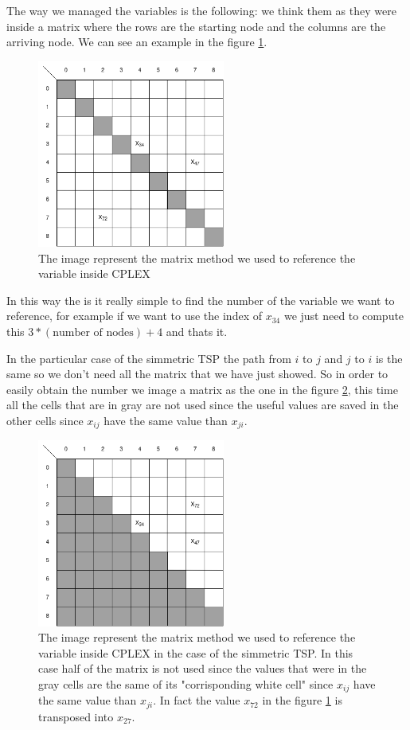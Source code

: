 The way we managed the variables is the following: we think them as they were inside a matrix where the rows are the starting node and the columns are the arriving node. We can see an example in the figure \ref{img:full_matrix}.

\begin{figure}[h]
	\centering
	\includegraphics[width=0.55\textwidth]{images/full_matrix}
	\caption{The image represent the matrix method we used to reference the variable inside CPLEX}
	\label{img:full_matrix}
\end{figure}

In this way the is it really simple to find the number of the variable we want to reference, for example if we want to use the index of $x_{34}$ we just need to compute this $3 * (\text{number of nodes}) + 4$ and thats it.

In the particular case of the simmetric TSP the path from $i$ to $j$ and $j$ to $i$ is the same so we don't need all the matrix that we have just showed. So in order to easily obtain the number we image a matrix as the one in the figure \ref{img:full_matrix_simm}, this time all the cells that are in gray are not used since the useful values are saved in the other cells since $x_{ij}$ have the same value than $x_{ji}$.


\begin{figure}[h]
	\centering
	\includegraphics[width=0.55\textwidth]{images/full_matrix_simmetric}
	\caption{The image represent the matrix method we used to reference the variable inside CPLEX in the case of the simmetric TSP. In this case half of the matrix is not used since the values that were in the gray cells are the same of its "corrisponding white cell" since $x_{ij}$ have the same value than $x_{ji}$. In fact the value $x_{72}$ in the figure \ref{img:full_matrix} is transposed into $x_{27}$.}
	\label{img:full_matrix_simm}
\end{figure}
